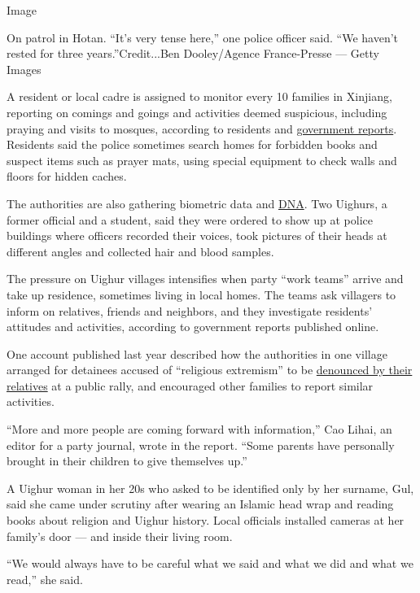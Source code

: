 Image

On patrol in Hotan. ``It's very tense here,'' one police officer said.
``We haven't rested for three years.''Credit...Ben Dooley/Agence
France-Presse --- Getty Images

A resident or local cadre is assigned to monitor every 10 families in
Xinjiang, reporting on comings and goings and activities deemed
suspicious, including praying and visits to mosques, according to
residents and
\href{http://kzls.xjkunlun.cn/www.xjkzdj.cn/xwsd/bddt/2017/5502935.htm}{government
reports}. Residents said the police sometimes search homes for forbidden
books and suspect items such as prayer mats, using special equipment to
check walls and floors for hidden caches.

The authorities are also gathering biometric data and
\href{https://www.hrw.org/news/2017/12/13/china-minority-region-collects-dna-millions}{DNA}.
Two Uighurs, a former official and a student, said they were ordered to
show up at police buildings where officers recorded their voices, took
pictures of their heads at different angles and collected hair and blood
samples.

The pressure on Uighur villages intensifies when party ``work teams''
arrive and take up residence, sometimes living in local homes. The teams
ask villagers to inform on relatives, friends and neighbors, and they
investigate residents' attitudes and activities, according to government
reports published online.

One account published last year described how the authorities in one
village arranged for detainees accused of ``religious extremism'' to be
\href{http://www.cqvip.com/read/read.aspx?id=7000154900}{denounced by
their relatives} at a public rally, and encouraged other families to
report similar activities.

``More and more people are coming forward with information,'' Cao Lihai,
an editor for a party journal, wrote in the report. ``Some parents have
personally brought in their children to give themselves up.''

A Uighur woman in her 20s who asked to be identified only by her
surname, Gul, said she came under scrutiny after wearing an Islamic head
wrap and reading books about religion and Uighur history. Local
officials installed cameras at her family's door --- and inside their
living room.

``We would always have to be careful what we said and what we did and
what we read,'' she said.

